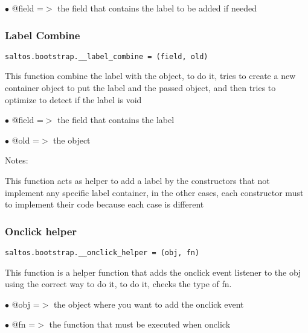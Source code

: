 \documentclass[a4paper]{article}
\begin{document}
\begin{compactitem}
\item[\color{myblue}$\bullet$] @field =$>$ the field that contains the label to be added if needed
\end{compactitem}

\hypertarget{toc656}{}
\subsubsection{Label Combine}

\begin{lstlisting}
saltos.bootstrap.__label_combine = (field, old)
\end{lstlisting}

This function combine the label with the object, to do it, tries to create a new
container object to put the label and the passed object, and then tries to optimize
to detect if the label is void

\begin{compactitem}
\item[\color{myblue}$\bullet$] @field =$>$ the field that contains the label
\item[\color{myblue}$\bullet$] @old   =$>$ the object
\end{compactitem}

Notes:

This function acts as helper to add a label by the constructors that not implement
any specific label container, in the other cases, each constructor must to implement
their code because each case is different

\hypertarget{toc657}{}
\subsubsection{Onclick helper}

\begin{lstlisting}
saltos.bootstrap.__onclick_helper = (obj, fn)
\end{lstlisting}

This function is a helper function that adds the onclick event listener to the obj
using the correct way to do it, to do it, checks the type of fn.

\begin{compactitem}
\item[\color{myblue}$\bullet$] @obj   =$>$ the object where you want to add the onclick event
\item[\color{myblue}$\bullet$] @fn    =$>$ the function that must be executed when onclick
\end{compactitem}
\end{document}
